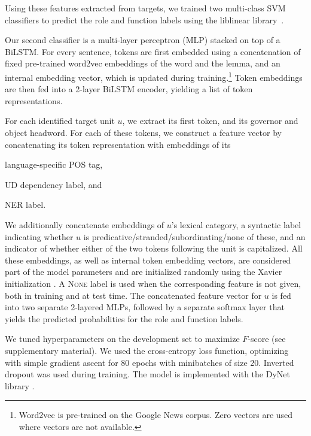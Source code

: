 \pdfoutput=1 \documentclass[11pt,a4paper]{article}
\makeatletter
\renewcommand{\paragraph}{\@startsection{paragraph}{4}{\z@}{.2ex \@plus 1ex \@minus .2ex}{-1em}{\normalfont\normalsize\bfseries}}
\makeatother
\begin{document}
Using these features extracted from targets, we trained two multi-class SVM classifiers to
predict the role and function labels using the {\sc liblinear}
library~\cite{fan2008liblinear}.

\paragraph{Neural Model.}
Our second classifier is a multi-layer perceptron (MLP) stacked on top of a BiLSTM.
For every sentence, tokens are first embedded using a concatenation of fixed pre-trained word2vec \cite{mikolov2013distributed} 
embeddings of the word and the lemma, and an internal embedding vector, which is updated during training.\footnote{Word2vec is pre-trained on the Google News corpus. 
Zero vectors are used where vectors are not available.}
Token embeddings are then fed into a 2-layer BiLSTM encoder, yielding a list of token representations.

For each identified target unit $u$, we extract its first token, 
and its governor and  object headword. 
For each of these tokens, we construct a feature vector by concatenating its token representation with embeddings of its
\begin{inparaenum}[(1)]
\item language-specific POS tag, 
\item UD dependency label, and
\item NER label.
\end{inparaenum}
We additionally concatenate embeddings of $u$'s lexical category, 
a syntactic label indicating whether $u$ is predicative\slash stranded\slash subordinating\slash none of these,
and
an indicator of whether either of the two tokens following the unit is capitalized. All these embeddings, as well as internal token embedding vectors, are
considered part of the model parameters and are initialized randomly using the Xavier initialization \cite{glorot2010xavier}. A \textsc{None} label 
is used when the corresponding feature is not given, both in training and at test time. 
The concatenated feature vector for $u$ is fed into two separate 2-layered MLPs, followed by a separate softmax layer that yields
the predicted probabilities for the role and function labels. 



We tuned hyperparameters on the development set to maximize $F$-score (see supplementary material).
We used the cross-entropy loss function, optimizing with simple gradient ascent for 80 epochs with minibatches of size 20. 
Inverted dropout was used during training.
The model is implemented with the DyNet library \citep{dynet}. 
\end{document}
